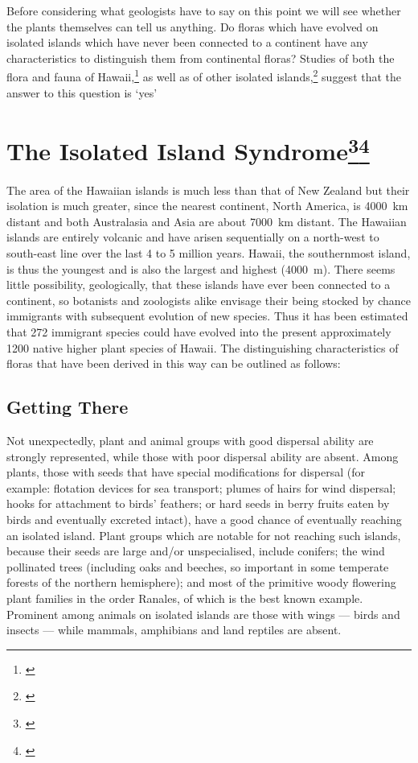 Before considering what geologists have to say on this point we will see whether the plants themselves can tell us anything.
Do floras which have evolved on isolated islands which have never been connected to a continent have any characteristics to distinguish them from continental floras? Studies of both the flora and fauna of Hawai{\okina}i,\footnote{\cite{carlquist1970hawaii}} as well as of other isolated islands,\footnote{\cite{carlquist1965island}} suggest that the answer to this question is `yes'

\section[The Isolated Island Syndrome]{The Isolated Island Syndrome\thinspace\footnote{\cite{ehrendorfer1979reproductive}}\footnote{\cite{lloyd1985progress}}}

The area of the Hawaiian islands is much less than that of New Zealand but their isolation is much greater, since the nearest continent, North America, is \SI{4000}{\kilo\metre} distant and both Australasia and Asia are about \SI{7000}{\kilo\metre} distant.
The Hawaiian islands are entirely volcanic and have arisen sequentially on a north-west to south-east line over the last 4 to 5 million years.
Hawai{\okina}i, the southernmost island, is thus the youngest and is also the largest and highest (\SI{4000}{\metre}).
There seems little possibility, geologically, that these islands have ever been connected to a continent, so botanists and zoologists alike envisage their being stocked by chance immigrants with subsequent evolution of new species.
Thus it has been estimated that 272 immigrant species could have evolved into the present approximately 1200 native higher plant species of Hawai{\okina}i.
The distinguishing characteristics of floras that have been derived in this way can be outlined as follows:

\subsection{Getting There}

Not unexpectedly, plant and animal groups with good dispersal ability are strongly represented, while those with poor dispersal ability are absent.
Among plants, those with seeds that have special modifications for dispersal (for example: flotation devices for sea transport; plumes of hairs for wind dispersal; hooks for attachment to birds' feathers; or hard seeds in berry fruits eaten by birds and eventually excreted intact), have a good chance of eventually reaching an isolated island.
Plant groups which are notable for not reaching such islands, because their seeds are large and/or unspecialised, include conifers; the wind pollinated trees (including oaks and beeches, so important in some temperate forests of the northern hemisphere); and most of the primitive woody flowering plant families in the order Ranales, of which  is the best known example.
Prominent among animals on isolated islands are those with wings --- birds and insects --- while mammals, amphibians and land reptiles are absent.

